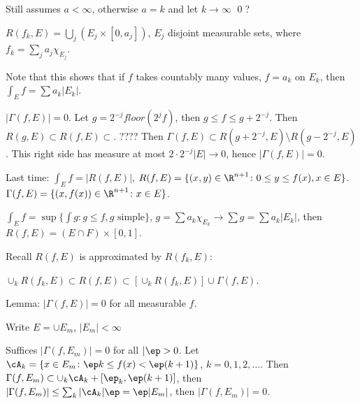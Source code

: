 Still assumes $a<\infty$, otherwise $a=k$ and let $k \to \infty$ \qed? \\





\begin{lem} \label{lem:1}
$R(f_k,E)= \bigcup_j (E_j \times [0,a_j])$, $E_j$ disjoint measurable sets, where $f_k = \sum_j a_j \chi_{E_j}$. 
\end{lem}



Note that this shows that if $f$ takes countably many values, $f=a_k$ on $E_k$, then $\int_E f = \sum a_k |E_k|$. 




\begin{lem} \label{lem:2}
$|\Gamma(f,E)|=0$. Let $g= 2^{-j} floor(2^jf)$, then $g \leq f \leq g+ 2^{-j}$. Then $R(g,E) \subset R(f,E) \subset $. ???? Then $\Gamma(f,E) \subset R(g+2^{-j}, E) \setminus R(g-2^{-j},E)$. This right side has measure at most $2\cdot 2^{-j} |E| \to 0$, hence $|\Gamma(f,E)|=0$. 
\end{lem}









Last time: $\int_E f= |R(f,E)|$, $R(f,E)= \{ (x,y) \in \R^{n+1} \colon 0 \leq y \leq f(x), x \in E\}$. $\Gamma(f,E)= \{ (x,f(x)) \in \R^{n+1} \colon x \in E\}$. 

$\int_E f= \sup \{ \int g \colon g \leq f, g \text{ simple}\}$, $g= \sum a_k \chi_{E_k} \to \sum g= \sum a_k |E_k|$, then $R(f,E)= (E \cap F) \times [0,1]$. 

Recall $R(f,E)$ is approximated by $R(f_k,E)$:

$\cup_k R(f_k,E) \subset R(f,E) \subset \left[ \cup_k R(f_k,E) \right] \cup \Gamma(f,E)$.


Lemma: $|\Gamma(f,E)|=0$ for all measurable $f$.

\pf Write $E= \cup E_m$, $|E_m|<\infty$

Suffices $|\Gamma(f,E_m)|=0$ for all $|\ep>0$. Let $\cA_k=\{ x \in E_m \colon \ep k \leq f(x)< \ep(k+1)\}$, $k=0,1,2,\ldots$. Then $\Gamma(f,E_m) \subset \cup_k \cA_k + [\ep_k,\ep(k+1)]$, then $|\Gamma(f,E_m)| \leq \sum_k |\cA_k| \ep = \ep |E_m|$, then $|\Gamma(f,E_m)|=0$. 




